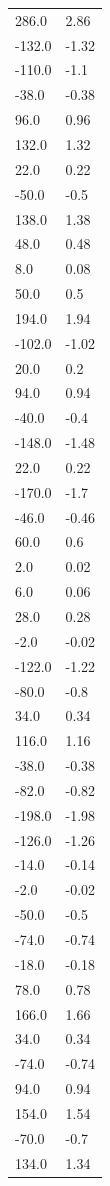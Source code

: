 \begin{longtable}{ll}
286.0 & 2.86 \\
-132.0 & -1.32 \\
-110.0 & -1.1 \\
-38.0 & -0.38 \\
96.0 & 0.96 \\
132.0 & 1.32 \\
22.0 & 0.22 \\
-50.0 & -0.5 \\
138.0 & 1.38 \\
48.0 & 0.48 \\
8.0 & 0.08 \\
50.0 & 0.5 \\
194.0 & 1.94 \\
-102.0 & -1.02 \\
20.0 & 0.2 \\
94.0 & 0.94 \\
-40.0 & -0.4 \\
-148.0 & -1.48 \\
22.0 & 0.22 \\
-170.0 & -1.7 \\
-46.0 & -0.46 \\
60.0 & 0.6 \\
2.0 & 0.02 \\
6.0 & 0.06 \\
28.0 & 0.28 \\
-2.0 & -0.02 \\
-122.0 & -1.22 \\
-80.0 & -0.8 \\
34.0 & 0.34 \\
116.0 & 1.16 \\
-38.0 & -0.38 \\
-82.0 & -0.82 \\
-198.0 & -1.98 \\
-126.0 & -1.26 \\
-14.0 & -0.14 \\
-2.0 & -0.02 \\
-50.0 & -0.5 \\
-74.0 & -0.74 \\
-18.0 & -0.18 \\
78.0 & 0.78 \\
166.0 & 1.66 \\
34.0 & 0.34 \\
-74.0 & -0.74 \\
94.0 & 0.94 \\
154.0 & 1.54 \\
-70.0 & -0.7 \\
134.0 & 1.34 \\

\end{longtable}
